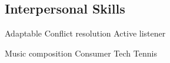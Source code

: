 \documentclass{dske-resume-openfont}
\begin{document}
\begin{minipage}[t]{0.31\textwidth}
{{\fontsize{\the\leftSubsectionSize}{\the\leftSubsectionLineSpace}\selectfont\subsection{Interpersonal Skills}}
Adaptable \textbullet{} Conflict resolution \textbullet{} Active listener
}
\vspace{\leftSectionPadding}


{\fontsize{\the\rightColumnFont}{\the\rightColumnLineSpace}\selectfont
Music composition \textbullet{} Consumer Tech \textbullet{} Tennis
}



%
%

\end{minipage} 
\hspace{\rightColumnSpace}
\end{document}
